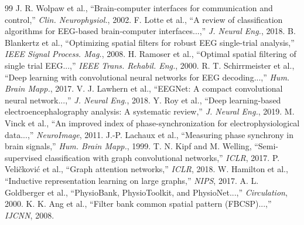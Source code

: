 \documentclass[conference]{IEEEtran}
\begin{document}
\begin{thebibliography}{99}
 J. R. Wolpaw et al., ``Brain-computer interfaces for communication and control,'' \emph{Clin. Neurophysiol.}, 2002.
 F. Lotte et al., ``A review of classification algorithms for EEG-based brain-computer interfaces...,'' \emph{J. Neural Eng.}, 2018.
 B. Blankertz et al., ``Optimizing spatial filters for robust EEG single-trial analysis,'' \emph{IEEE Signal Process. Mag.}, 2008.
 H. Ramoser et al., ``Optimal spatial filtering of single trial EEG...,'' \emph{IEEE Trans. Rehabil. Eng.}, 2000.
 R. T. Schirrmeister et al., ``Deep learning with convolutional neural networks for EEG decoding...,'' \emph{Hum. Brain Mapp.}, 2017.
 V. J. Lawhern et al., ``EEGNet: A compact convolutional neural network...,'' \emph{J. Neural Eng.}, 2018.
 Y. Roy et al., ``Deep learning-based electroencephalography analysis: A systematic review,'' \emph{J. Neural Eng.}, 2019.
 M. Vinck et al., ``An improved index of phase-synchronization for electrophysiological data...,'' \emph{NeuroImage}, 2011.
 J.-P. Lachaux et al., ``Measuring phase synchrony in brain signals,'' \emph{Hum. Brain Mapp.}, 1999.
 T. N. Kipf and M. Welling, ``Semi-supervised classification with graph convolutional networks,'' \emph{ICLR}, 2017.
 P. Veličković et al., ``Graph attention networks,'' \emph{ICLR}, 2018.
 W. Hamilton et al., ``Inductive representation learning on large graphs,'' \emph{NIPS}, 2017.
 A. L. Goldberger et al., ``PhysioBank, PhysioToolkit, and PhysioNet...,'' \emph{Circulation}, 2000.
 K. K. Ang et al., ``Filter bank common spatial pattern (FBCSP)...,'' \emph{IJCNN}, 2008.
\end{thebibliography}
\end{document}

